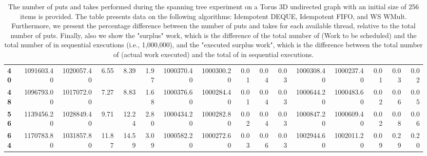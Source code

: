 \begin{table}[!ht]
{\begin{tabular}{lrrrrrrrrrrrrrrr}
\textbf{40} &       1091603.40 & 1020057.40 &           6.55 &        8.39 &                 1.97 &      1000370.40 & 1000300.20 &           0.01 &        0.04 &                 0.03 & 1000308.40 & 1000237.40 &           0.01 &        0.03 &                 0.02 \\
\textbf{48} &       1096793.00 & 1017072.00 &           7.27 &        8.83 &                 1.68 &      1000376.60 & 1000284.40 &           0.01 &        0.04 &                 0.03 & 1000644.20 & 1000483.60 &           0.02 &        0.06 &                 0.05 \\
\textbf{56} &       1139456.20 & 1028849.40 &           9.71 &       12.24 &                 2.80 &      1000434.20 & 1000282.80 &           0.02 &        0.04 &                 0.03 & 1000847.20 & 1000609.40 &           0.02 &        0.08 &                 0.06 \\
\textbf{64} &       1170783.80 & 1031857.80 &          11.87 &       14.59 &                 3.09 &      1000582.20 & 1000272.60 &           0.03 &        0.06 &                 0.03 & 1002944.60 & 1002011.20 &           0.09 &        0.29 &                 0.20 \\
\bottomrule
\end{tabular}}
\label{difference-Torus_3D_undirected-256-IDEMPOTENT_DEQUE-IDEMPOTENT_FIFO-WS_NC_MULT_OPT}
\caption{The number of puts and takes performed during the
    spanning tree experiment on a Torus 3D undirected graph with an initial size
    of 256 items is provided. The table presents data on the
    following algorithms: Idempotent DEQUE, Idempotent FIFO, and
    WS WMult. Furthermore, we present the percentage difference
    between the number of puts and takes for each available thread,
    relative to the total number of puts. Finally, also we show the
    "surplus" work, which is the difference of the total number of
    \Puts (Work to be scheduled) and the total number of \Puts in
    sequential executions (i.e., 1,000,000), and the "executed surplus
    work", which is the difference between the total number of \Takes
    (actual work executed) and the total of \Takes in sequential
    executions.}
\end{table}
